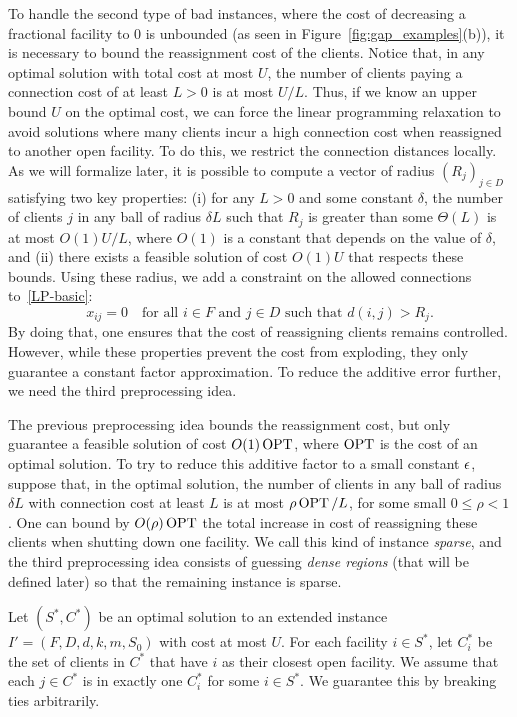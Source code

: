To handle the second type of bad instances, where the cost of decreasing a fractional facility to $0$ is unbounded (as seen in Figure~\ref{fig:gap_examples}(b)), it is necessary to bound the reassignment cost of the clients.
Notice that, in any optimal solution with total cost at most $U$, the number of clients paying a connection cost of at least $L > 0$ is at most $U/L$. Thus, if we know an upper bound $U$ on the optimal cost, we can force the linear programming relaxation to avoid solutions where many clients incur a high connection cost when reassigned to another open facility.
To do this, we restrict the connection distances locally. As we will formalize later, it is possible to compute a vector of radius $(R_j)_{j \in D}$ satisfying two key properties: (i) for any $L > 0$ and some constant $\delta$, the number of clients $j$ in any ball of radius $\delta L$ such that $R_j$ is greater than some $\Theta(L)$ is at most $O(1)U/L$, where $O(1)$ is a constant that depends on the value of $\delta$, and (ii) there exists a feasible solution of cost $O(1)U$ that respects these bounds. Using these radius, we add a constraint on the allowed connections to~\eqref{LP-basic}:
\[
x_{ij} = 0 \quad \text{for all } i \in F \text{ and } j \in D \text{ such that } d(i,j) > R_j.
\]
By doing that, one ensures that the cost of reassigning clients remains controlled.
However, while these properties prevent the cost from exploding, they only guarantee a constant factor approximation. To reduce the additive error further, we need the third preprocessing idea.

The previous preprocessing idea bounds the reassignment cost, but only guarantee a feasible solution of cost $O(1)\operatorname{OPT}$, where $\operatorname{OPT}$ is the cost of an optimal solution. To try to reduce this additive factor to a small constant $\epsilon$, suppose that, in the optimal solution, the number of clients in any ball of radius $\delta L$ with connection cost at least $L$ is at most $\rho \operatorname{OPT}/L$, for some small $0 \leq \rho < 1$. One can bound by $O(\rho)\operatorname{OPT}$ the total increase in cost of reassigning these clients when shutting down one facility. We call this kind of instance \emph{sparse}, and the third preprocessing idea consists of guessing \emph{dense regions} (that will be defined later) so that the remaining instance is sparse.

Let $(S^*, C^*)$ be an optimal solution to an extended instance $I' = (F, D, d, k, m, S_0)$ with cost at most $U$. For each facility $i \in S^*$, let $C_i^*$ be the set of clients in $C^*$ that have $i$ as their closest open facility. We assume that each $j \in C^*$ is in exactly one $C_i^*$ for some $i \in S^*$. We guarantee this by breaking ties arbitrarily.

